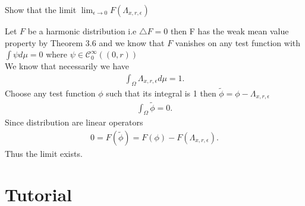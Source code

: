 \begin{exercise}[c]
  Show that the limit $\lim_{\epsilon \to 0} F(\Lambda_{x,r,\epsilon })$ 
\end{exercise}
\begin{solution}
 Let $F$ be a harmonic distribution i.e $\triangle F = 0$ then  F has the weak mean value property by Theorem 3.6
 and we know that $F$ vanishes on any test function with $\int \psi d\mu = 0$ where $\psi \in  \mathcal{C}^{\infty}_0((0,r)) $\\
 We know that necessarily  we have 
\begin{align*}
 \int_\Omega  \Lambda_{x,r,\epsilon }  d\mu = 1 
.\end{align*} 
Choose any test function $\phi $ such that its integral is 1  then $\tilde{\phi } = \phi - \Lambda_{x,r,\epsilon}$  
\begin{align*}
  \int_\Omega  \tilde{\phi } = 0
.\end{align*}
Since distribution are linear operators 
\begin{align*}
  0 = F(\tilde{\phi }) = F(\phi) - F(\Lambda_{x,r,\epsilon })
.\end{align*}
Thus the limit exists.
\end{solution}
\section{Tutorial}
